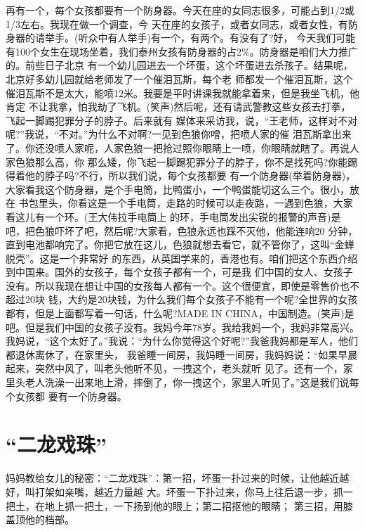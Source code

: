 \documentclass[11pt,a4paper,onecolumn]{article}
\begin{document}
再有一个，每个女孩都要有一个防身器。今天在座的女同志很多，可能占到1/2或1/3左右。我现在做一个调查，今
天在座的女孩子，或者女同志，或者女性，有防身器的请举手。(听众中有人举手)有一个，有两个。有没有了?好，
今天我们可能有100个女生在现场坐着，我们泰州女孩有防身器的占2\%。防身器是咱们大力推广的。前些日子北京
有一个幼儿园进去一个坏蛋，这个坏蛋进去杀孩子。结果呢，北京好多幼儿园就给老师发了一个催泪瓦斯，每个老
师都发一个催泪瓦斯，这个催泪瓦斯不是太大，能喷12米。我要是平时讲课我就能拿着来，但是我坐飞机，他肯定
不让我拿，怕我劫了飞机。(笑声)然后呢，还有请武警教这些女孩去打拳，飞起一脚踢犯罪分子的脖子。后来就有
媒体来采访我，说，``王老师，这样对不对呢?''我说，``不对。''为什么不对啊?一见到色狼你噌，把喷人家的催
泪瓦斯拿出来了。你还没喷人家呢，人家色狼一把抢过照你眼睛上一喷，你眼睛就瞎了。再说人家色狼那么高，你
那么矮，你飞起一脚踢犯罪分子的脖子，你不是找死吗?你能踢得着他的脖子吗?不行，所以我们说，每个女孩都要
有一个防身器(举着防身器)，大家看我这个防身器，是个手电筒，比鸭蛋小，一个鸭蛋能切这么三个。很小，放在
书包里头，你看这是一个手电筒，走路的时候可以走夜路，一遇到色狼，大家看这儿有一个环。(王大伟拉手电筒上
的环，手电筒发出尖锐的报警的声音)是吧，把色狼吓坏了吧，然后呢?大家看，色狼永远也踩不灭他，他能连响20
分钟，直到电池都响完了。你把它放在这儿，色狼就想去看它，就不管你了，这叫``金蝉脱壳''。这是一个非常好
的东西，从英国学来的，香港也有。咱们把这个东西介绍到中国来。国外的女孩子，每个女孩子都有一个，可是我
们中国的女人、女孩子没有。所以我现在想让中国的女孩每人都有一个。这个很便宜，即使是零售价也不超过20块
钱，大约是20块钱，为什么我们每个女孩子不能有一个呢?全世界的女孩都有，但是上面都写着一句话，什么呢?MADE
IN CHINA，中国制造。(笑声)是吧。但是我们中国的女孩子没有。我妈今年78岁。我给我妈一个，我妈非常高兴。
我妈说，``这个太好了。''我说：``为什么你觉得这个好呢?''我爸我妈都是军人，他们都退休离休了，在家里头，
我爸睡一间房，我妈睡一间房，我妈妈说：``如果早晨起来，突然中风了，叫老头他听不见，一拽这个，老头就听
见了。还有一个，家里头老人洗澡一出来地上滑，摔倒了，你一拽这个，家里人听见了。''这是我们说每个女孩都
要有一个防身器。

\section{``二龙戏珠''}


妈妈教给女儿的秘密：``二龙戏珠''：第一招，坏蛋一扑过来的时候，让他越近越好，叫打架如亲嘴，越近力量越
大。坏蛋一下扑过来，你马上往后退一步，抓一把土，在地上抓一把土，一下扬到他的眼上；第二招抠他的眼睛；
第三招，用膝盖顶他的档部。
\end{document}
